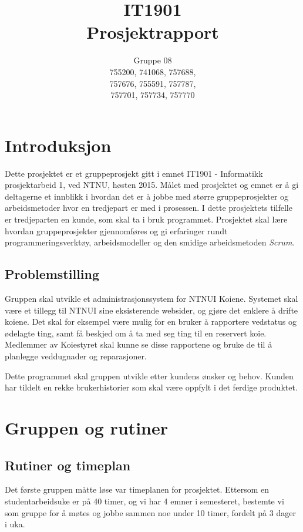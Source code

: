 \documentclass[12pt,a4paper,norsk]{article}
\title{IT1901 \\ Prosjektrapport}
\author{Gruppe 08\\
    755200, 741068, 757688,\\
    757676, 755591, 757787,\\
    757701, 757734, 757770}
\begin{document}
  \maketitle
  \newpage
  \tableofcontents
  \newpage
  \section{Introduksjon}

Dette prosjektet er et gruppeprosjekt gitt i emnet IT1901 - Informatikk prosjektarbeid 1, ved NTNU, høsten 2015. Målet med prosjektet og emnet er å gi deltagerne et innblikk i hvordan det er å jobbe med større gruppeprosjekter og  arbeidsmetoder hvor en tredjepart er med i prosessen. I dette prosjektets tilfelle er tredjeparten en kunde, som skal ta i bruk programmet. Prosjektet skal lære hvordan gruppeprosjekter gjennomføres og gi erfaringer rundt programmeringsverktøy, arbeidsmodeller og den smidige arbeidsmetoden \textit{Scrum}.

\subsection{Problemstilling}

Gruppen skal utvikle et administrasjonssystem for NTNUI Koiene. Systemet skal være et tillegg til NTNUI sine eksisterende websider, og gjøre det enklere å drifte koiene. Det skal for eksempel være mulig for en bruker å rapportere vedstatus og ødelagte ting, samt få beskjed om å ta med seg ting til en reservert koie. Medlemmer av Koiestyret skal kunne se disse rapportene og bruke de til å planlegge veddugnader og reparasjoner.

Dette programmet skal gruppen utvikle etter kundens ønsker og behov. Kunden har tildelt en rekke brukerhistorier som skal være oppfylt i det ferdige produktet.

\section{Gruppen og rutiner}
\subsection{Rutiner og timeplan}

Det første gruppen måtte løse var timeplanen for prosjektet. Ettersom en studentarbeidsuke er på 40 timer, og vi har 4 emner i semesteret, bestemte vi som gruppe for å møtes og jobbe sammen noe under 10 timer, fordelt på 3 dager i uka.
\end{document}
